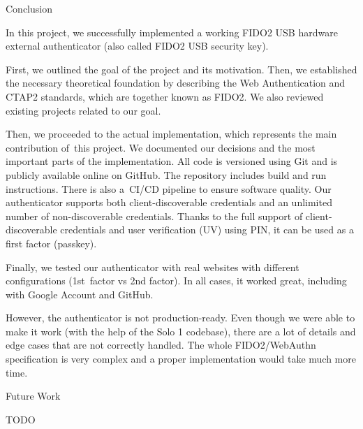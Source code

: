 \chap[conclusion] Conclusion

In this project, {\sbf we successfully implemented} a working FIDO2 USB hardware external authenticator (also called FIDO2 USB security key).

First, we outlined the goal of the project and its motivation. Then, we established the necessary theoretical foundation by describing the Web Authentication and CTAP2 standards, which are together known as FIDO2. We also reviewed existing projects related to our goal.

Then, we proceeded to the actual implementation, which represents the main contribution of~this project. We documented our decisions and the most important parts of the implementation. All code is versioned using Git and is publicly {\sbf available online on GitHub}. The repository includes build and run instructions. There is also a~CI/CD pipeline to ensure software quality. Our authenticator supports both client-discoverable credentials and an unlimited number of non-discoverable credentials. Thanks to the full support of client-discoverable credentials and user verification (UV) using PIN, it can be used as a first factor (passkey).

Finally, {\sbf we tested} our authenticator {\sbf with real websites} with different configurations (1st~factor vs 2nd factor). In all cases, {\sbf it worked great}, including with Google Account and GitHub.

However, the authenticator is not production-ready. Even though we were able to make it work (with the help of the Solo 1 codebase), there are a lot of details and edge cases that are not correctly handled. The whole FIDO2/WebAuthn specification is very complex and a proper implementation would take much more time.


\sec Future Work

TODO
